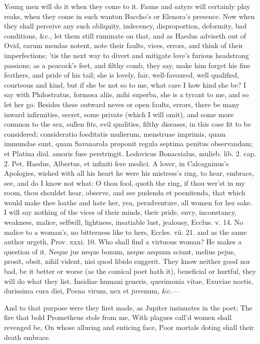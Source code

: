 {Young men will do it when they come to it. Fauns and satyrs will
certainly play reaks, when they come in such wanton Baccho's or
Elenora's presence. Now when they shall perceive any such obliquity,
indecency, disproportion, deformity, bad conditions, \&c., let them
still ruminate on that, and as Haedus adviseth out of Ovid, earum
mendas notent, note their faults, vices, errors, and think of their
imperfections; 'tis the next way to divert and mitigate love's furious
headstrong passions; as a peacock's feet, and filthy comb, they say,
make him forget his fine feathers, and pride of his tail; she is
lovely, fair, well-favoured, well qualified, courteous and kind, but if
she be not so to me, what care I how kind she be? I say with
Philostratus, formosa aliis, mihi superba, she is a tyrant to me,
and so let her go. Besides these outward neves or open faults, errors,
there be many inward infirmities, secret, some private (which I will
omit), and some more common to the sex, sullen fits, evil qualities,
filthy diseases, in this case fit to be considered; consideratio
foeditatis mulierum, menstruae imprimis, quam immundae sunt, quam
Savanarola proponit regula septima penitus observandam; et Platina
dial. amoris fuse perstringit. Lodovicus Bonacsialus, mulieb. lib. 2.
cap. 2. Pet. Haedus, Albertus, et infiniti fere medici. A lover,
in Calcagninus's Apologies, wished with all his heart he were his
mistress's ring, to hear, embrace, see, and do I know not what: O thou
fool, quoth the ring, if thou wer'st in my room, thou shouldst hear,
observe, and see pudenda et poenitenda, that which would make thee
loathe and hate her, yea, peradventure, all women for her sake.
I will say nothing of the vices of their minds, their pride, envy,
inconstancy, weakness, malice, selfwill, lightness, insatiable lust,
jealousy, Ecclus. v. 14. No malice to a woman's, no bitterness like to
hers, Eccles. vii. 21. and as the same author urgeth, Prov. xxxi. 10.
Who shall find a virtuous woman? He makes a question of it. Neque jus
neque bonum, neque aequum sciunt, melius pejus, prosit, obsit, nihil
vident, nisi quod libido suggerit. They know neither good nor bad, be
it better or worse (as the comical poet hath it), beneficial or
hurtful, they will do what they list.
Insidiae humani generis, querimonia vitae,
Exuviae noctis, durissima cura diei,
Poena virum, nex et juvenum, \&c.---

And to that purpose were they first made, as Jupiter insinuates in the
poet;
The fire that bold Prometheus stole from me,
With plagues call'd women shall revenged be,
On whose alluring and enticing face,
Poor mortals doting shall their death embrace.

}

